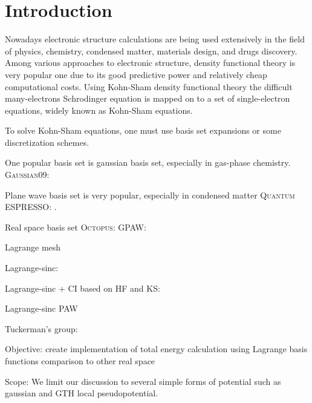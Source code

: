 \section{Introduction}

Nowadays electronic structure calculations are being used extensively in the field of
physics, chemistry, condensed matter, materials design, and drugs discovery.
Among various approaches to electronic structure, density functional theory
\cite{Hohenberg1964} is very popular one due to its good predictive
power and relatively cheap computational costs.
Using Kohn-Sham density functional theory \cite{Kohn1965} the difficult many-electrons
Schrodinger equation is mapped on to a set of single-electron equations, widely known
as Kohn-Sham equations.

To solve Kohn-Sham equations, one must use basis set expansions or some discretization
schemes.

One popular basis set is gaussian basis set, especially
in gas-phase chemistry. \textsc{Gaussian09}: \cite{Gaussian2009}

Plane wave basis set is very popular, especially in condensed matter
\textsc{Quantum ESPRESSO}: \cite{Giannozzi2009,Giannozzi2017}.

Real space basis set \textsc{Octopus}: \cite{Marques2003,Castro2006,Xavier2015}
GPAW: \cite{Enkovaara2010}

Lagrange mesh \cite{Baye2015}

Lagrange-sinc: \cite{Choi2015,Choi2016}

Lagrange-sinc + CI based on HF and KS: \cite{Kim2015}

Lagrange-sinc PAW \cite{Kang2016}

Tuckerman's group: \cite{HeeSeungLee2006,HeeSeungLee2006,HeeSeungLee2008}

Objective:
create implementation of total energy calculation using Lagrange basis functions
comparison to other real space

Scope: We limit our discussion to several simple forms of potential such as
gaussian and GTH local pseudopotential.
